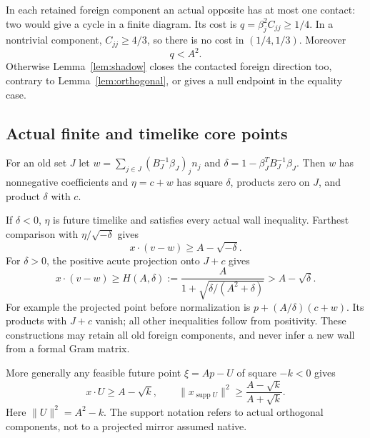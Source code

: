 \documentclass[11pt]{article}
\theoremstyle{remark}
\begin{document}
In each retained foreign component an actual opposite has at most
one contact: two would give a cycle in a finite diagram. Its cost
is $q=\beta_j^2C_{jj}\ge1/4$. In a nontrivial component,
$C_{jj}\ge4/3$, so there is no cost in $(1/4,1/3)$.
Moreover
\begin{equation}\label{eq:foreign}
 q<A^2.
\end{equation}
Otherwise Lemma~\ref{lem:shadow} closes the contacted foreign
direction too, contrary to Lemma~\ref{lem:orthogonal}, or gives a
null endpoint in the equality case.

\subsection{Actual finite and timelike core points}

For an old set $J$ let $w=\sum_{j\in J}(B_J^{-1}\beta_J)_j n_j$
and $\delta=1-\beta_J^TB_J^{-1}\beta_J$. Then $w$ has nonnegative
coefficients and $\eta=c+w$ has square $\delta$, products zero on
$J$, and product $\delta$ with $c$.

If $\delta<0$, $\eta$ is future timelike and satisfies every actual
wall inequality. Farthest comparison with $\eta/\sqrt{-\delta}$ gives
\begin{equation}\label{eq:negativefoot}
 x\cdot(v-w)\ge A-\sqrt{-\delta}.
\end{equation}
For $\delta>0$, the positive acute projection onto $J+c$ gives
\begin{equation}\label{eq:finitefoot}
 x\cdot(v-w)\ge H(A,\delta):=
 \frac{A}{1+\sqrt{\delta/(A^2+\delta)}}>A-\sqrt\delta.
\end{equation}
For example the projected point before normalization is
$p+(A/\delta)(c+w)$. Its products with $J+c$ vanish; all other
inequalities follow from positivity. These constructions may retain
all old foreign components, and never infer a new wall from a
formal Gram matrix.

More generally any feasible future point $\xi=A p-U$ of square
$-k<0$ gives
\begin{equation}\label{eq:pointenergy}
 x\cdot U\ge A-\sqrt k,\qquad
 \|x_{\operatorname{supp}U}\|^2\ge
 \frac{A-\sqrt k}{A+\sqrt k}.
\end{equation}
Here $\|U\|^2=A^2-k$. The support notation refers to actual
orthogonal components, not to a projected mirror assumed native.
\end{document}
